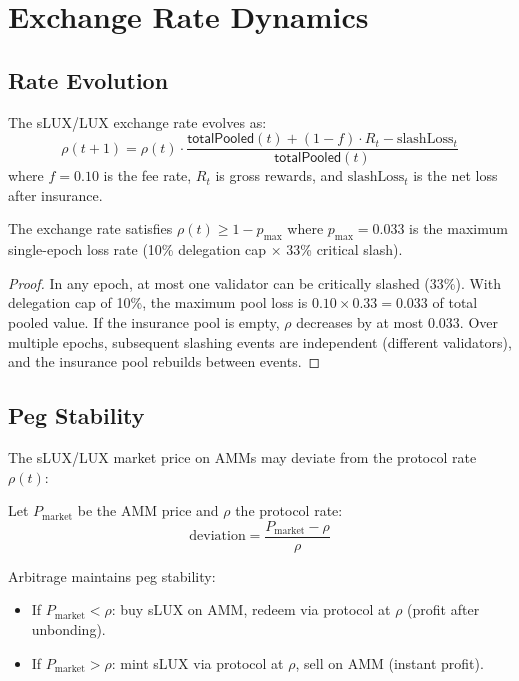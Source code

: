 \section{Exchange Rate Dynamics}
\label{sec:dynamics}

\subsection{Rate Evolution}

The sLUX/LUX exchange rate evolves as:
\begin{equation}
    \rho(t+1) = \rho(t) \cdot \frac{\mathsf{totalPooled}(t) + (1-f) \cdot R_t - \text{slashLoss}_t}{\mathsf{totalPooled}(t)}
\end{equation}
where $f = 0.10$ is the fee rate, $R_t$ is gross rewards, and $\text{slashLoss}_t$ is the net loss after insurance.

\begin{theorem}
The exchange rate satisfies $\rho(t) \geq 1 - p_{\text{max}}$ where $p_{\text{max}} = 0.033$ is the maximum single-epoch loss rate (10\% delegation cap $\times$ 33\% critical slash).
\end{theorem}

\begin{proof}
In any epoch, at most one validator can be critically slashed (33\%). With delegation cap of 10\%, the maximum pool loss is $0.10 \times 0.33 = 0.033$ of total pooled value. If the insurance pool is empty, $\rho$ decreases by at most $0.033$. Over multiple epochs, subsequent slashing events are independent (different validators), and the insurance pool rebuilds between events.
\end{proof}

\subsection{Peg Stability}

The sLUX/LUX market price on AMMs may deviate from the protocol rate $\rho(t)$:

\begin{definition}
Let $P_{\text{market}}$ be the AMM price and $\rho$ the protocol rate:
\begin{equation}
    \text{deviation} = \frac{P_{\text{market}} - \rho}{\rho}
\end{equation}
\end{definition}

Arbitrage maintains peg stability:
\begin{itemize}
    \item If $P_{\text{market}} < \rho$: buy sLUX on AMM, redeem via protocol at $\rho$ (profit after unbonding).
    \item If $P_{\text{market}} > \rho$: mint sLUX via protocol at $\rho$, sell on AMM (instant profit).
\end{itemize}

